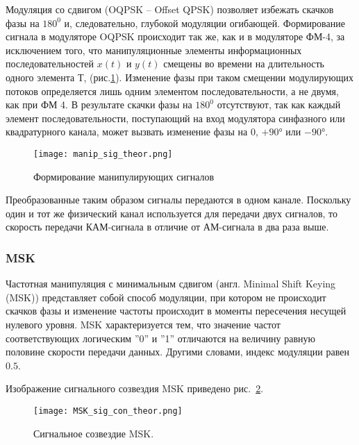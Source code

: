 Модуляция со сдвигом (OQPSK – Offset QPSK) позволяет избежать скачков фазы на $180^0$ и, следовательно, глубокой модуляции
 огибающей. Формирование сигнала в модуляторе OQPSK происходит так же, как и в модуляторе ФМ-4, за исключением того, что
  манипуляционные элементы информационных последовательностей $x(t)$ и $y(t)$ смещены во времени на длительность одного 
  элемента $Т$, (рис.\ref{manip_sig_theor}). Изменение фазы при таком смещении модулирующих потоков определяется лишь одним 
  элементом последовательности, а не двумя, как при ФМ 4. В результате скачки фазы на $180^0$ отсутствуют, так как каждый 
  элемент последовательности, поступающий на вход модулятора синфазного или квадратурного канала, может вызвать изменение 
  фазы на $0$, $+90°$ или $-90°$.
\begin{figure}[H]
	\begin{center}
		\texttt{[image: manip\_sig\_theor.png]}
		\caption{Формирование манипулирующих сигналов} %
		\label{manip_sig_theor} %
	\end{center}
\end{figure} 

Преобразованные таким образом сигналы передаются в одном канале. Поскольку один и тот же физический канал используется для передачи двух сигналов, то скорость передачи КАМ-сигнала в отличие от АМ-сигнала в два раза выше.


\subsubsection{MSK}
Частотная манипуляция с минимальным сдвигом (англ. Minimal Shift Keying (MSK)) представляет собой способ модуляции, при котором не происходит скачков фазы и изменение частоты происходит в моменты пересечения несущей нулевого уровня.
 MSK характеризуется тем, что значение частот соответствующих логическим ''0'' и ''1'' отличаются на величину равную половине скорости передачи данных. Другими словами, индекс модуляции равен $0.5$.

Изображение сигнального созвездия MSK приведено рис.~\ref{MSK_sig_con_theor}.

\begin{figure}[H]
	\begin{center}
		\texttt{[image: MSK\_sig\_con\_theor.png]}
		\caption{Сигнальное созвездие MSK.} %
		\label{MSK_sig_con_theor} %
	\end{center}
\end{figure}

